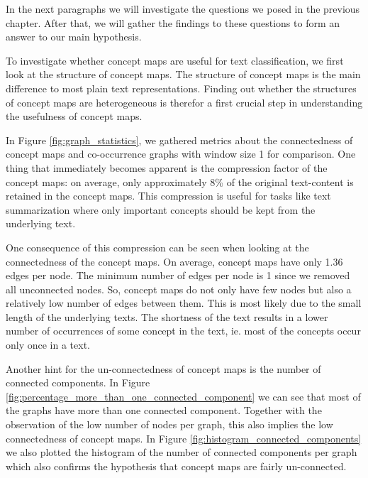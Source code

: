 In the next paragraphs we will investigate the questions we posed in the previous chapter.
After that, we will gather the findings to these questions to form an answer to our main hypothesis.


To investigate whether concept maps are useful for text classification, we first look at the structure of concept maps.
The structure of concept maps is the main difference to most plain text representations.
Finding out whether the structures of concept maps are heterogeneous is therefor a first crucial step in understanding the usefulness of concept maps.

In Figure \ref{fig:graph_statistics}, we gathered metrics about the connectedness of concept maps and co-occurrence graphs with window size 1 for comparison.
One thing that immediately becomes apparent is the compression factor of the concept maps: on average, only approximately 8\% of the original text-content is retained in the concept maps.
This compression is useful for tasks like text summarization where only important concepts should be kept from the underlying text.

One consequence of this compression can be seen when looking at the connectedness of the concept maps.
On average, concept maps have only 1.36 edges per node. The minimum number of edges per node is 1 since we removed all unconnected nodes.
So, concept maps do not only have few nodes but also a relatively low number of edges between them.
This is most likely due to the small length of the underlying texts.
The shortness of the text results in a lower number of occurrences of some concept in the text, ie. most of the concepts occur only once in a text.

Another hint for the un-connectedness of concept maps is the number of connected components.
In Figure \ref{fig:percentage_more_than_one_connected_component} we can see that most of the graphs have more than one connected component. Together with the observation of the low number of nodes per graph, this also implies the low connectedness of concept maps.
In Figure \ref{fig:histogram_connected_components} we also plotted the histogram of the number of connected components per graph which also confirms the hypothesis that concept maps are fairly un-connected.

